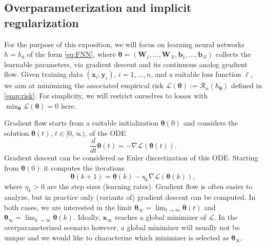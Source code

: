 \documentclass{svproc}
\newcommand{\bb}{\boldsymbol{b}}
\newcommand{\bW}{\boldsymbol{W}}
\newcommand{\bx}{\boldsymbol{x}}
\newcommand{\by}{\boldsymbol{y}}
\newcommand{\btheta}{{\boldsymbol{\theta}}}
\newcommand{\0}{\boldsymbol{0}}
\newcommand{\1}{\boldsymbol{1}}
\newcommand{\calR}{\mathcal{R}}
\def\calR{\mathcal{R}}
\def\tdisc{{k}}
\begin{document}
\subsection{Overparameterization and implicit regularization}



For the purpose of this exposition, we will focus on learning neural networks $h=h_{\theta}$ of the form \eqref{eq:FNN}, where $\btheta = (\bW_1,\hdots,\bW_N,\bb_1,\hdots,\bb_N)$ collects the learnable parameters, via gradient descent and its continuous analog gradient flow. Given training data $(\bx_i,\by_i)$, $i=1,\hdots,n$, and a suitable loss function $\ell$, we aim at minimizing the associated empirical risk $\mathcal L(\btheta) := \calR_n (h_\btheta)$ defined in \eqref{emp:risk}. For simplicity, we will restrict ourselves to losses with $\min_\btheta \mathcal L(\btheta) = 0$ here.

Gradient flow starts from a suitable initialization $\btheta(0)$ and considers the solution $\btheta(t)$, $t \in [0,\infty)$, of the ODE
\begin{equation}
\label{def:grad-flow}
\frac{d}{dt} \btheta(t) = - \nabla\mathcal{L}(\btheta(t)).
\end{equation}
Gradient descent can be considered as Euler discretization of this ODE. Starting from $\btheta(0)$ it computes the iterations
\begin{equation}
\label{def:grad-descent}
\btheta(\tdisc+1) = \btheta(\tdisc) - \eta_\tdisc\nabla\mathcal{L}(\btheta(\tdisc)),
\end{equation}
where $\eta_\tdisc>0$ are the step sizes (learning rates).
Gradient flow is often easier to analyze, but in practice only (variants of) gradient descent can be computed. 
In both cases, we are interested in the limit $\btheta_\infty = \lim_{t \to \infty} \btheta(t)$ and $\btheta_\infty = \lim_{\tdisc \to \infty} \btheta(\tdisc)$. Ideally, $\bx_\infty$ reaches a global minimizer of $\mathcal{L}$. In the overparameterized scenario however, a global minimizer will usually not be unique and we would like to characterize which minimizer is selected as $\btheta_\infty$.
\end{document}
